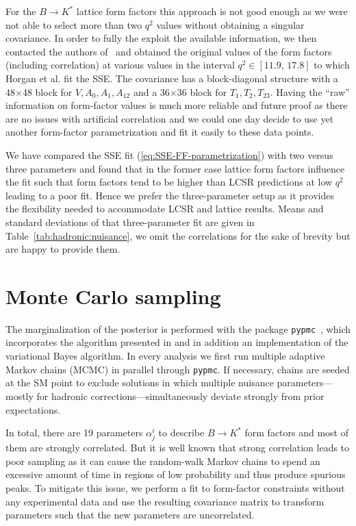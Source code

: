 \documentclass[twocolumn,epjc3]{svjour3}
\numberwithin{equation}{section}
\def \refeq#1{(\ref{#1})}
\def \reftab#1{Table~\ref{#1}}
\newcommand{\checked}[1]{{\color{brown}{ {\bf Checked: }{#1}}}}
\renewcommand{\checked}[1]{#1}
\renewcommand{\[}{\big[}
\renewcommand{\]}{\big]}
\renewcommand{\(}{\big(}
\renewcommand{\)}{\big)}
\begin{document}
For the $B \to K^*$ lattice form factors this approach is not good
enough as we were not able to select more than two $q^2$ values
without obtaining a singular covariance. In order to fully the exploit
the available information, we then contacted the authors
of~\cite{Horgan:2015vla} and obtained the original values of the form
factors (including correlation) at various values in the interval $q^2
\in [11.9,\, 17.8]$ to which Horgan et al. fit the SSE. The covariance
has a block-diagonal structure with a 48$\times$48 block for $V, A_0,
A_1, A_{12}$ and a 36$\times$36 block for $T_1, T_2, T_{23}$. Having
the ``raw'' information on form-factor values is much more reliable
and future proof as there are no issues with artificial correlation
and we could one day decide to use yet another form-factor
parametrization and fit it easily to these data points.

We have compared the SSE fit \refeq{eq:SSE-FF-parametrization} with two versus
three parameters and found that in the former case lattice form factors
influence the fit such that form factors tend to be higher than LCSR predictions
at low $q^2$ leading to a poor fit. Hence we prefer the three-parameter setup as
it provides the flexibility needed to accommodate LCSR and lattice results. Means
and standard {deviations} of that three-parameter fit are given in
\reftab{tab:hadronic:nuisance}, we omit the correlations for the sake of brevity
but are happy to provide them.


\section{\checked{Monte Carlo sampling} \label{app:mc}}

The marginalization of the posterior is performed
with the package {\tt pypmc}~\cite{beaujean_2015_20045}, which incorporates the
algorithm presented in \cite{Beaujean:2013:PMC, Beaujean:2012uj} and in addition
an implementation of the variational Bayes algorithm. In every analysis we first
run multiple adaptive Markov chains (MCMC) in parallel through
\texttt{pypmc}. If necessary, chains are seeded at the SM point to exclude
solutions in which multiple nuisance parameters---mostly for hadronic
corrections---simultaneously deviate strongly from prior expectations.

In total, there are 19 parameters $\alpha^i_j$ to describe $B\to K^*$ form
factors and most of them are strongly correlated. But it is well known that
strong correlation leads to poor sampling as it can cause the random-walk Markov
chains to spend an excessive amount of  time in regions of low probability and
thus produce spurious peaks. To mitigate this issue, we perform a fit to
form-factor constraints without any experimental data and use the resulting
covariance matrix to transform parameters such that the new parameters are
uncorrelated.
\end{document}
